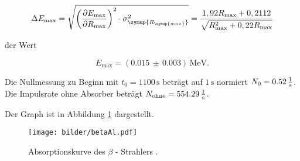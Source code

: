 \begin{equation}
 \Delta E_\text{max} = \sqrt{\left(\frac{\partial E_\text{max}}{\partial
R_\text{max}}\right)^2 \cdot \sigma_\symup{R_\symup{max}}^2} =
\frac{1,92 R_\text{max} + 0,2112}{\sqrt{R_\text{max}^2 + 0,22
R_\text{max}}}
\end{equation}

der Wert

\begin{equation}
 E_\text{max} = (0.015\,\pm\,0.003)\,\si{\mega\electronvolt}.
\end{equation}
\par\bigskip

Die Nullmessung zu Beginn mit $t_\text{0} = 1100\,\si{\second}$ beträgt
auf $1\,\si{\second}$ normiert $N_\text{0} =
0.52\,\si[per-mode=fraction]{\per\second}$. Die Impulsrate ohne Absorber
beträgt $N_\text{ohne} =
554.29\,\si[per-mode=fraction]{\per\second}$.

Der Graph ist in Abbildung \ref{fig:absorp} dargestellt.

\begin{figure}[H]
 \centering
 \texttt{[image: bilder/betaAl.pdf]}
 \caption{Absorptionskurve des $\beta$ - Strahlers .}
 \label{fig:absorp}
\end{figure}
